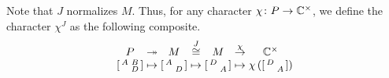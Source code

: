 \begin{definition} \label{def:chi-j}
    Note that $J$ normalizes $M$.
    Thus, for any character $\chi\colon P\to\mathbb C^\times$, we define the character $\chi^J$ as the following composite.
	\[\arraycolsep=1.4pt\begin{array}{cccccccc}
		P &\onto& M &\stackrel J\cong& M &\stackrel\chi\to& \CC^\times \\
		\begin{bsmallmatrix}
			A & B \\ & D
		\end{bsmallmatrix} &\mapsto& \begin{bsmallmatrix}
			A \\ & D
		\end{bsmallmatrix} &\mapsto& \begin{bsmallmatrix}
			D \\ & A 
		\end{bsmallmatrix} &\mapsto& \chi\left(\begin{bsmallmatrix}
			D \\ & A 
		\end{bsmallmatrix}\right)
	\end{array}\]
\end{definition}
